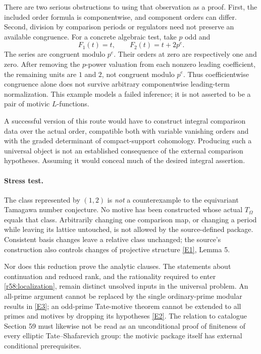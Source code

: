 \documentclass[11pt,a4paper]{article}
\newcommand{\eref}[2]{\hyperlink{extra:#1:#2}{[E#2]}}
\numberwithin{equation}{section}
\begin{document}
There are two serious obstructions to using that observation as a proof. First, the included order formula is componentwise, and component orders can differ. Second, division by comparison periods or regulators need not preserve an available congruence. For a concrete algebraic test, take $p$ odd and
\[
 F_1(t)=t,\qquad F_2(t)=t+2p^e.
\]
The series are congruent modulo $p^e$. Their orders at zero are respectively one and zero. After removing the $p$-power valuation from each nonzero leading coefficient, the remaining units are $1$ and $2$, not congruent modulo $p^e$. Thus coefficientwise congruence alone does not survive arbitrary componentwise leading-term normalization. This example models a failed inference; it is not asserted to be a pair of motivic $L$-functions.

A successful version of this route would have to construct integral comparison data over the actual order, compatible both with variable vanishing orders and with the graded determinant of compact-support cohomology. Producing such a universal object is not an established consequence of the external comparison hypotheses. Assuming it would conceal much of the desired integral assertion.

\paragraph{Stress test.}
The class represented by $(1,2)$ is \emph{not} a counterexample to the equivariant Tamagawa number conjecture. No motive has been constructed whose actual $T_\Omega$ equals that class. Arbitrarily changing one comparison map, or changing a period while leaving its lattice untouched, is not allowed by the source-defined package. Consistent basis changes leave a relative class unchanged; the source's construction also controls changes of projective structure \eref{30006700}{1}, Lemma 5.

Nor does this reduction prove the analytic clauses. The statements about continuation and reduced rank, and the rationality required to enter \eqref{r58:localization}, remain distinct unsolved inputs in the universal problem. An all-prime argument cannot be replaced by the single ordinary-prime modular results in \eref{30006700}{3}; an odd-prime Tate-motive theorem cannot be extended to all primes and motives by dropping its hypotheses \eref{30006700}{2}. The relation to catalogue Section 59 must likewise not be read as an unconditional proof of finiteness of every elliptic Tate--Shafarevich group: the motivic package itself has external conditional prerequisites.
\end{document}
